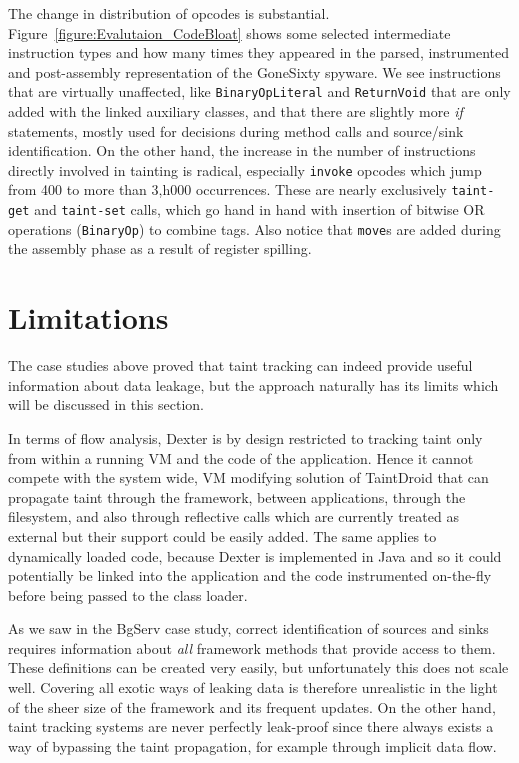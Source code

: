 \documentclass[12pt,twoside,notitlepage]{report}
\begin{document}
The change in distribution of opcodes is substantial. Figure~\ref{figure:Evalutaion_CodeBloat} shows some selected intermediate instruction types and how many times they appeared in the parsed, instrumented and post-assembly representation of the GoneSixty spyware. We see instructions that are virtually unaffected, like \verb$BinaryOpLiteral$ and \verb$ReturnVoid$ that are only added with the linked auxiliary classes, and that there are slightly more \emph{if} statements, mostly used for decisions during method calls and source/sink identification. On the other hand, the increase in the number of instructions directly involved in tainting is radical, especially \verb$invoke$ opcodes which jump from 400 to more than 3,h000 occurrences. These are nearly exclusively \verb$taint-get$ and \verb$taint-set$ calls, which go hand in hand with insertion of bitwise OR operations (\verb$BinaryOp$) to combine tags. Also notice that \verb$move$s are added during the assembly phase as a result of register spilling.

\section{Limitations}

The case studies above proved that taint tracking can indeed provide useful information about data leakage, but the approach naturally has its limits which will be discussed in this section. 

In terms of flow analysis, Dexter is by design restricted to tracking taint only from within a running VM and the code of the application. Hence it cannot compete with the system wide, VM modifying solution of TaintDroid that can propagate taint through the framework, between applications, through the filesystem, and also through reflective calls which are currently treated as external but their support could be easily added. The same applies to dynamically loaded code, because Dexter is implemented in Java and so it could potentially be linked into the application and the code instrumented on-the-fly before being passed to the class loader.

As we saw in the BgServ case study, correct identification of sources and sinks requires information about \emph{all} framework methods that provide access to them. These definitions can be created very easily, but unfortunately this does not scale well. Covering all exotic ways of leaking data is therefore unrealistic in the light of the sheer size of the framework and its frequent updates. On the other hand, taint tracking systems are never perfectly leak-proof since there always exists a way of bypassing the taint propagation, for example through implicit data flow.
\end{document}
